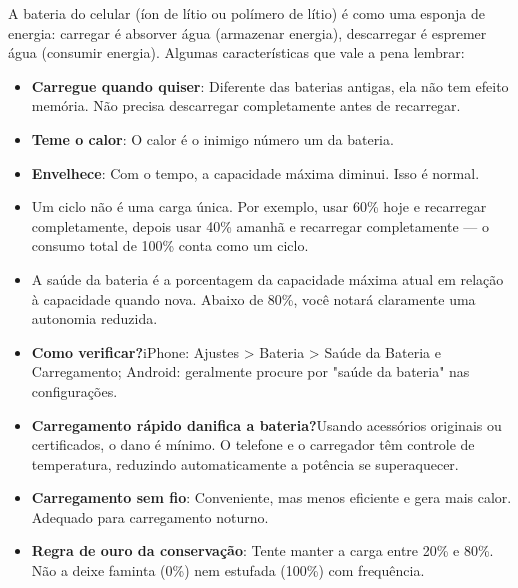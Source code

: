 


A bateria do celular (íon de lítio ou polímero de lítio) é como uma esponja de energia: carregar é absorver água (armazenar energia), descarregar é espremer água (consumir energia). Algumas características que vale a pena lembrar:

\begin{itemize}
  \item \textbf{Carregue quando quiser}: Diferente das baterias antigas, ela não tem efeito memória. Não precisa descarregar completamente antes de recarregar.
  \item \textbf{Teme o calor}: O calor é o inimigo número um da bateria.
  \item \textbf{Envelhece}: Com o tempo, a capacidade máxima diminui. Isso é normal.
\end{itemize}


\begin{itemize}
  \item Um ciclo não é uma carga única. Por exemplo, usar 60\% hoje e recarregar completamente, depois usar 40\% amanhã e recarregar completamente — o consumo total de 100\% conta como um ciclo.
  \item A saúde da bateria é a porcentagem da capacidade máxima atual em relação à capacidade quando nova. Abaixo de 80\%, você notará claramente uma autonomia reduzida.
  \item \textbf{Como verificar?}iPhone: Ajustes > Bateria > Saúde da Bateria e Carregamento; Android: geralmente procure por "saúde da bateria" nas configurações.
\end{itemize}


\begin{itemize}
  \item \textbf{Carregamento rápido danifica a bateria?}Usando acessórios originais ou certificados, o dano é mínimo. O telefone e o carregador têm controle de temperatura, reduzindo automaticamente a potência se superaquecer.
  \item \textbf{Carregamento sem fio}: Conveniente, mas menos eficiente e gera mais calor. Adequado para carregamento noturno.
  \item \textbf{Regra de ouro da conservação}: Tente manter a carga entre 20\% e 80\%. Não a deixe faminta (0\%) nem estufada (100\%) com frequência.
\end{itemize}

